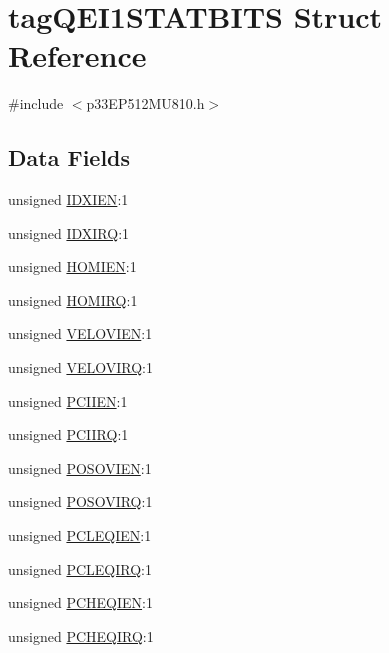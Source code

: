 \hypertarget{structtag_q_e_i1_s_t_a_t_b_i_t_s}{}\section{tag\+Q\+E\+I1\+S\+T\+A\+T\+B\+I\+TS Struct Reference}
\label{structtag_q_e_i1_s_t_a_t_b_i_t_s}


{\ttfamily \#include $<$p33\+E\+P512\+M\+U810.\+h$>$}

\subsection*{Data Fields}
\begin{DoxyCompactItemize}
\item 
unsigned \hyperlink{structtag_q_e_i1_s_t_a_t_b_i_t_s_ae75a0f9636a86752c0936129346743c3}{I\+D\+X\+I\+EN}\+:1
\item 
unsigned \hyperlink{structtag_q_e_i1_s_t_a_t_b_i_t_s_a6841efdcfe08b769fa40ce03ab1f08e7}{I\+D\+X\+I\+RQ}\+:1
\item 
unsigned \hyperlink{structtag_q_e_i1_s_t_a_t_b_i_t_s_a9b76df246fc22bd8a69d0bfc50ceddf9}{H\+O\+M\+I\+EN}\+:1
\item 
unsigned \hyperlink{structtag_q_e_i1_s_t_a_t_b_i_t_s_a4921e69bb8feedfbe162929108ac26c2}{H\+O\+M\+I\+RQ}\+:1
\item 
unsigned \hyperlink{structtag_q_e_i1_s_t_a_t_b_i_t_s_ae01860f2dc36a69ff1e81ce65661c28d}{V\+E\+L\+O\+V\+I\+EN}\+:1
\item 
unsigned \hyperlink{structtag_q_e_i1_s_t_a_t_b_i_t_s_ad75eda4eefa6358d4d1d03b82b30ce9c}{V\+E\+L\+O\+V\+I\+RQ}\+:1
\item 
unsigned \hyperlink{structtag_q_e_i1_s_t_a_t_b_i_t_s_a2ef6222fd1249228332feebae5381efd}{P\+C\+I\+I\+EN}\+:1
\item 
unsigned \hyperlink{structtag_q_e_i1_s_t_a_t_b_i_t_s_a3b364ff02d04c6f4722f62d09326c81d}{P\+C\+I\+I\+RQ}\+:1
\item 
unsigned \hyperlink{structtag_q_e_i1_s_t_a_t_b_i_t_s_adab3f48113ee0fb91e55573891da844b}{P\+O\+S\+O\+V\+I\+EN}\+:1
\item 
unsigned \hyperlink{structtag_q_e_i1_s_t_a_t_b_i_t_s_a00c5d80daf45593bbc35f3a07e1410c0}{P\+O\+S\+O\+V\+I\+RQ}\+:1
\item 
unsigned \hyperlink{structtag_q_e_i1_s_t_a_t_b_i_t_s_a827dd6a06be3aab016be425b720f3353}{P\+C\+L\+E\+Q\+I\+EN}\+:1
\item 
unsigned \hyperlink{structtag_q_e_i1_s_t_a_t_b_i_t_s_affd3f46352586784f86b3f7723360d2f}{P\+C\+L\+E\+Q\+I\+RQ}\+:1
\item 
unsigned \hyperlink{structtag_q_e_i1_s_t_a_t_b_i_t_s_aec419f32b912394dfde6e45a8569382f}{P\+C\+H\+E\+Q\+I\+EN}\+:1
\item 
unsigned \hyperlink{structtag_q_e_i1_s_t_a_t_b_i_t_s_a81eff3120ba837852e42c44dd693b774}{P\+C\+H\+E\+Q\+I\+RQ}\+:1
\end{DoxyCompactItemize}


